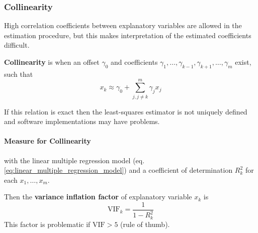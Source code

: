 \documentclass[11pt]{article}
\theoremstyle{definition}
\begin{document}
\subsubsection{Collinearity}
High correlation coefficients between explanatory variables are allowed in the estimation procedure, but this makes interpretation of the estimated coefficients difficult.
\begin{definition}
	\textbf{Collinearity} is when an offset $\gamma_0$ and coefficients $\gamma_1,\dots,\gamma_{k-1},\gamma_{k+1},\dots,\gamma_m$ exist, such that
	\begin{equation}
		x_k\approx \gamma_0 + \sum_{j,j\neq k}^{m} \gamma_j x_j
		\label{eq:linear_multiple_regression_model}
	\end{equation}
\end{definition}
 If this relation is exact then the least-squares estimator is not uniquely defined and software implementations may have problems.

\paragraph{Measure for Collinearity} with the linear multiple regression model (eq. \ref{eq:linear_multiple_regression_model}) and a coefficient of determination $R_k^2$ for each $x_1,\dots,x_m$.

Then the \textbf{variance inflation factor} of explanatory variable $x_k$ is
\begin{equation*}
	\text{VIF}_k = \frac{1}{1 - R_k^2}
\end{equation*}
This factor is problematic if $\text{VIF} > 5$ (rule of thumb).
\end{document}
